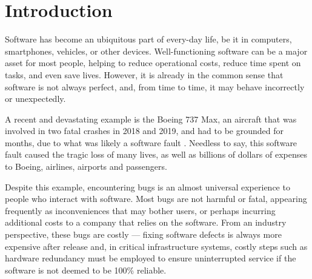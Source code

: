 \chapter{Introduction}\label{chap:intro}

Software has become an ubiquitous part of every-day life, be it in computers, smartphones, vehicles, or other devices.
Well-functioning software can be a major asset for most people, helping to reduce operational costs, reduce time spent on tasks, and even save lives.
However, it is already in the common sense that software is not always perfect, and, from time to time, it may behave incorrectly or unexpectedly.

A recent and devastating example is the Boeing 737 Max, an aircraft that was involved in two fatal crashes in 2018 and 2019, and had to be grounded for months, due to what was likely a software fault \cite{levin_latest_2019}.
Needless to say, this software fault caused the tragic loss of many lives, as well as billions of dollars of expenses to Boeing, airlines, airports and passengers.

Despite this example, encountering bugs is an almost universal experience to people who interact with software.
Most bugs are not harmful or fatal, appearing frequently as inconveniences that may bother users, or perhaps incurring additional costs to a company that relies on the software.
From an industry perspective, these bugs are costly --- fixing software defects is always more expensive after release and, in critical infrastructure systems, costly steps such as hardware redundancy must be employed to ensure uninterrupted service if the software is not deemed to be 100\% reliable.

